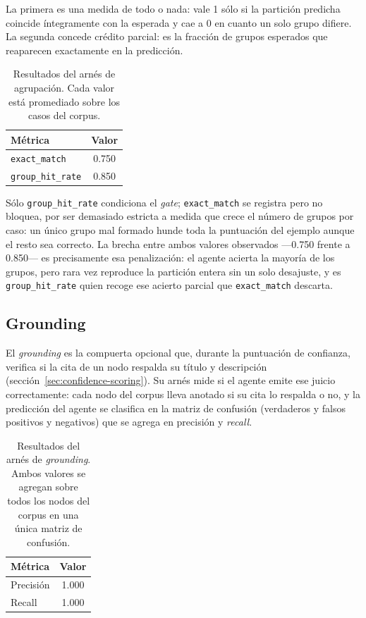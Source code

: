 La primera es una medida de todo o nada: vale 1 sólo si la partición predicha coincide íntegramente
con la esperada y cae a 0 en cuanto un solo grupo difiere. La segunda concede crédito parcial: es la
fracción de grupos esperados que reaparecen exactamente en la predicción.

\begin{table}[H]
  \centering
  \begin{tabular}{lc}
    \toprule
    \textbf{Métrica} & \textbf{Valor} \\
    \midrule
    \texttt{exact\_match}    & 0.750 \\
    \texttt{group\_hit\_rate}& 0.850 \\
    \bottomrule
  \end{tabular}
  \caption{Resultados del arnés de agrupación. Cada valor está promediado sobre los casos del
           corpus.}
  \label{tab:eval-grouping}
\end{table}

Sólo \texttt{group\_hit\_rate} condiciona el \textit{gate}; \texttt{exact\_match} se registra pero
no bloquea, por ser demasiado estricta a medida que crece el número de grupos por caso: un único
grupo mal formado hunde toda la puntuación del ejemplo aunque el resto sea correcto. La brecha entre
ambos valores observados —0.750 frente a 0.850— es precisamente esa penalización: el agente acierta
la mayoría de los grupos, pero rara vez reproduce la partición entera sin un solo desajuste, y es
\texttt{group\_hit\_rate} quien recoge ese acierto parcial que \texttt{exact\_match} descarta.

\subsection{Grounding}

El \textit{grounding} es la compuerta opcional que, durante la puntuación de confianza, verifica
si la cita de un nodo respalda su título y descripción
(sección~\ref{sec:confidence-scoring}). Su arnés mide si el agente emite ese juicio correctamente:
cada nodo del corpus lleva anotado si su cita lo respalda o no, y la predicción del agente se
clasifica en la matriz de confusión (verdaderos y falsos positivos y negativos) que se agrega en
precisión y \textit{recall}.

\begin{table}[H]
  \centering
  \begin{tabular}{lc}
    \toprule
    \textbf{Métrica} & \textbf{Valor} \\
    \midrule
    Precisión & 1.000 \\
    Recall    & 1.000 \\
    \bottomrule
  \end{tabular}
  \caption{Resultados del arnés de \textit{grounding}. Ambos valores se agregan sobre todos los
           nodos del corpus en una única matriz de confusión.}
  \label{tab:eval-grounding}
\end{table}

